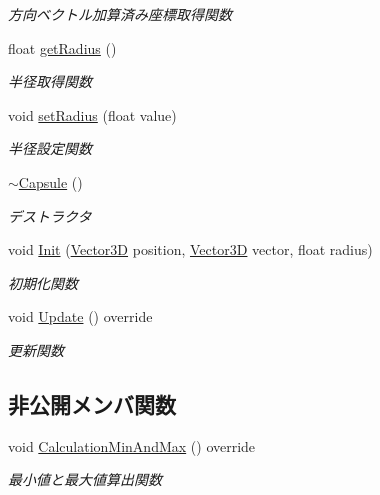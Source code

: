 \begin{DoxyCompactItemize}
\begin{DoxyCompactList}\small\item\em 方向ベクトル加算済み座標取得関数 \end{DoxyCompactList}\item 
float \mbox{\hyperlink{class_capsule_a4e98e8545ea57fe682c5a2002bd49bdb}{get\+Radius}} ()
\begin{DoxyCompactList}\small\item\em 半径取得関数 \end{DoxyCompactList}\item 
void \mbox{\hyperlink{class_capsule_a42d2233293d60384377ab4f4213be612}{set\+Radius}} (float value)
\begin{DoxyCompactList}\small\item\em 半径設定関数 \end{DoxyCompactList}\item 
\mbox{\hyperlink{class_capsule_abfd7f0348ce8e7f8ee4e70374ae27533}{$\sim$\+Capsule}} ()
\begin{DoxyCompactList}\small\item\em デストラクタ \end{DoxyCompactList}\item 
void \mbox{\hyperlink{class_capsule_a89dc585afa88e50e84a2f98bbf0bb400}{Init}} (\mbox{\hyperlink{class_vector3_d}{Vector3D}} position, \mbox{\hyperlink{class_vector3_d}{Vector3D}} vector, float radius)
\begin{DoxyCompactList}\small\item\em 初期化関数 \end{DoxyCompactList}\item 
void \mbox{\hyperlink{class_capsule_abfa1026590603a2971c5269171a50864}{Update}} () override
\begin{DoxyCompactList}\small\item\em 更新関数 \end{DoxyCompactList}\end{DoxyCompactItemize}
\subsection*{非公開メンバ関数}
\begin{DoxyCompactItemize}
\item 
void \mbox{\hyperlink{class_capsule_a52ada68cdb0c18a4dd8b4b169ad0d6df}{Calculation\+Min\+And\+Max}} () override
\begin{DoxyCompactList}\small\item\em 最小値と最大値算出関数 \end{DoxyCompactList}\end{DoxyCompactItemize}
